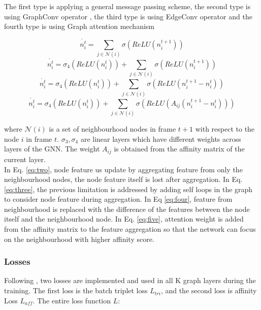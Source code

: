 \documentclass[10pt,twocolumn,letterpaper]{article}
\begin{document}
The first type is applying a general message passing scheme, the second type is using GraphConv operator \cite{berg2017graph}, the third type is using EdgeConv operator \cite{wang2019dynamic} and the fourth type is using Graph attention mechanism \cite{}

\begin{equation}\label{eq:two}
\acute{n^{t}_{i}} = \sum_{j \in \mathcal{N}(i)} \sigma(ReLU(n^{t+1}_{i}))
\end{equation}
\begin{equation}\label{eq:three}
\acute{n^{t}_{i}} = \sigma_{4}(ReLU(n^{t}_{i})) +  \sum_{j \in \mathcal{N}(i)} \sigma(ReLU(n^{t+1}_{i}))
\end{equation}
\begin{equation}\label{eq:four}
\acute{n^{t}_{i}} = \sigma_{4}(ReLU(n^{t}_{i})) +  \sum_{j \in \mathcal{N}(i)} \sigma(ReLU(n^{t+1}_{i} - n^{t}_{i}))
\end{equation}
\begin{equation}\label{eq:five}
\acute{n^{t}_{i}} = \sigma_{4}(ReLU(n^{t}_{i})) +  \sum_{j \in \mathcal{N}(i)} \sigma(ReLU(A_{ij}(n^{t+1}_{i} - n^{t}_{i})))
\end{equation}

where $\mathcal{N}(i)$ is a set of neighbourhood nodes in frame $t+1$ with respect to the node $i$ in frame $t$. $\sigma_{3}, \sigma_{4}$ are linear layers which have different weights across layers of the GNN. The weight $A_{ij}$ is obtained from the affinity matrix of the current layer. \\
In Eq. \ref{eq:two}, node feature us update by aggregating feature from only the neighbourhood nodes, the node feature itself is lost after aggregation. In Eq. \ref{eq:three}, the previous limitation is addressed by adding self loops in the graph to consider node feature during aggregation. In Eq \ref{eq:four}, feature from neighbourhood is replaced with the difference of the features between the node itself and the neighbourhood node. In Eq. \ref{eq:five}, attention weight is added from the affinity matrix to the feature aggregation so that the network can focus on the neighbourhood with higher affinity score.

\subsubsection{Losses}
Following \cite{weng2020gnn3dmot}, two losses are implemented and used in all K graph layers during the training. The first loss is the batch triplet loss $L_{tri}$, and the second loss is affinity Loss $L_{aff}$. The entire loss function $L$: 
\end{document}
